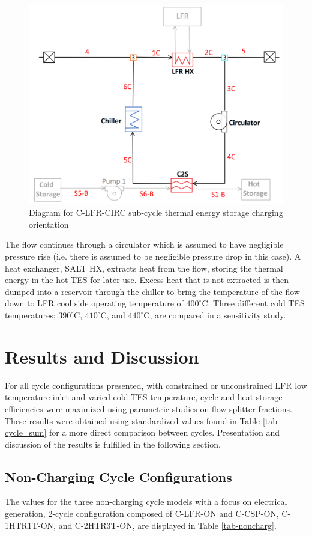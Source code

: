 \begin{figure}[H]
    \widefigure
    \includegraphics[width=8 cm]{Definitions/c-lfr-circ-sub.pdf}
    \caption{Diagram for C-LFR-CIRC sub-cycle thermal energy storage charging orientation\label{c-lfr-circ-sub}}
\end{figure}
\begin{paracol}{2}
\linenumbers
\switchcolumn

The flow continues through a circulator which is assumed to have negligible pressure rise (i.e. there is assumed to be negligible pressure drop in this case). A heat exchanger, SALT HX, extracts heat from the flow, storing the thermal energy in the hot TES for later use. Excess heat that is not extracted is then dumped into a reservoir through the chiller to bring the temperature of the flow down to LFR cool side operating temperature of $400^{\circ}$C. Three different cold TES temperatures; $390^{\circ}$C, $410^{\circ}$C, and $440^{\circ}$C, are compared in a sensitivity study. 



\section{Results and Discussion}

For all cycle configurations presented, with constrained or unconstrained LFR low temperature inlet and varied cold TES temperature, cycle and heat storage efficiencies were maximized using parametric studies on flow splitter fractions. These results were obtained using standardized values found in Table \ref{tab-cycle_sum} for a more direct comparison between cycles. Presentation and discussion of the results is fulfilled in the following section. 

\subsection{Non-Charging Cycle Configurations}

The values for the three non-charging cycle models with a focus on electrical generation, 2-cycle configuration composed of C-LFR-ON and C-CSP-ON, C-1HTR1T-ON, and C-2HTR3T-ON, are displayed in Table \ref{tab-noncharg}. 

\end{paracol}
